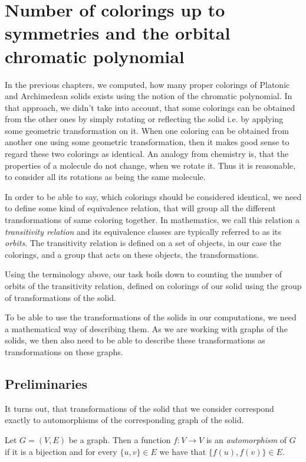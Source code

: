 \chapter{Number of colorings up to symmetries and the orbital chromatic polynomial}
\label{chap:clrings-up-to-symmetries}

In the previous chapters, we computed, how many proper colorings of Platonic and Archimedean solids exists using the notion of the chromatic polynomial. In that approach, we didn't take into account, that some colorings can be obtained from the other ones by simply rotating or reflecting the solid i.e. by applying some geometric transformation on it. When one coloring can be obtained from another one using some geometric transformation, then it makes good sense to regard these two colorings as identical. An analogy from chemistry is, that the properties of a molecule do not change, when we rotate it. Thus it is reasonable, to consider all its rotations as being the same molecule. 

In order to be able to say, which colorings should be considered identical, we need to define some kind of equivalence relation, that will group all the different transformations of same coloring together. In mathematics, we call this relation a \textit{transitivity relation} and its equivalence classes are typically referred to as its \textit{orbits}. The transitivity relation is defined on a set of objects, in our case the colorings, and a group that acts on these objects, the transformations.

Using the terminology above, our task boils down to counting the number of orbits of the transitivity relation, defined on colorings of our solid using the group of transformations of the solid.

To be able to use the transformations of the solids in our computations, we need a mathematical way of describing them. As we are working with graphs of the solids, we then also need to be able to describe these transformations as transformations on these graphs.


\section{Preliminaries}

It turns out, that transformations of the solid that we consider correspond exactly to automorphisms of the corresponding graph of the solid.

\begin{defn}[automorphism]
    Let $G=(V,E)$ be a graph. Then a function $f:V \rightarrow V$ is an \emph{automorphism} of $G$ if it is a bijection and for every $\{u,v\} \in E$ we have that $\{f(u),f(v)\} \in E$.
\end{defn}

